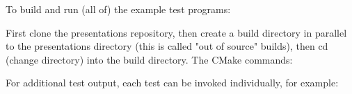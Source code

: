 To build and run (all of) the example test programs\+:

First clone the {\ttfamily presentations} repository, then create a build directory in parallel to the presentations directory (this is called "{}out of source"{} builds), then {\ttfamily cd} (change directory) into the build directory. The CMake commands\+:


\begin{DoxyCode}{0}
\DoxyCodeLine{}
\DoxyCodeLine{}

\end{DoxyCode}


For additional test output, each test can be invoked individually, for example\+:


\begin{DoxyCode}{0}

\end{DoxyCode}
 